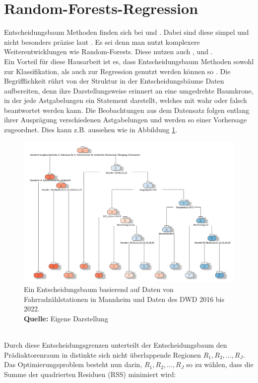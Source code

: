 \documentclass[a4paper,12pt]{thesis}
\newcommand*{\captionsource}[2]{%
	\caption[{#1}]{%
		#1%
		\\\hspace{\linewidth}%
		\textbf{Quelle:} #2%
	}%
}
\begin{document}
\section{Random-Forests-Regression}

Entscheidungsbaum Methoden finden sich bei \cite{Mitchell2018PredictingBT} und \cite{Gao2022}. Dabei sind diese simpel und nicht besonders präzise laut \cite{James2013TBM}. Es sei denn man nutzt komplexere Weiterentwicklungen wie Random-Forests. Diese nutzen auch \cite{Holmgren2017}, \cite{Broucke2019} und \cite{Mitchell2018PredictingBT}.\\ 
Ein Vorteil für diese Hausarbeit ist es, dass Entscheidungsbaum Methoden sowohl zur Klassifikation, als auch zur Regression genutzt werden können so \cite{James2013TBM}. Die Begrifflichkeit rührt von der Struktur in der Entscheidungsbäume Daten aufbereiten, denn ihre Darstellungsweise erinnert an eine umgedrehte Baumkrone, in der jede Astgabelungen ein Statement darstellt, welches mit wahr oder falsch beantwortet werden kann. Die Beobachtungen aus dem Datensatz folgen entlang ihrer Ausprägung verschiedenen Astgabelungen und werden so einer Vorhersage zugeordnet. Dies kann z.B. aussehen wie in Abbildung \ref{DTM1}.
\begin{figure}[!ht]
	\centering
	\includegraphics[width=16cm]{Plots/Entscheidungsbaum.png}
	\captionsource{Ein Entscheidungsbaum basierend auf Daten von Fahrradzählstationen in Mannheim und Daten des DWD 2016 bis 2022.}{
		Eigene Darstellung
	}
	\label{DTM1}
\end{figure}\\
Durch diese Entscheidungsgrenzen unterteilt der Entscheidungsbaum den Prädiaktorenraum in distinkte sich nicht überlappende Regionen $R_1,R_2,...,R_J$. Das Optimierungsproblem besteht nun darin, $R_1,R_2,...,R_J$ so zu wählen, dass die Summe der quadrierten Residuen (RSS) minimiert wird: 
\end{document}
